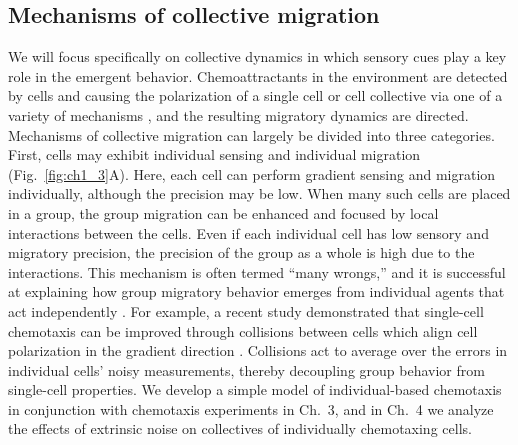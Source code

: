 \subsection{Mechanisms of collective migration}

We will focus specifically on collective dynamics in which sensory cues play a key role in the emergent behavior. Chemoattractants in the environment are detected by cells and causing the polarization of a single cell or cell collective via one of a variety of mechanisms \cite{jilkine2011comparison}, and the resulting migratory dynamics are directed.
Mechanisms of collective migration can largely be divided into three categories. First, cells may exhibit individual sensing and individual migration (Fig.\ \ref{fig:ch1_3}A). Here, each cell can perform gradient sensing and migration individually, although the precision may be low. When many such cells are placed in a group, the group migration can be enhanced and focused by local interactions between the cells. Even if each individual cell has low sensory and migratory precision, the precision of the group as a whole is high due to the interactions. This mechanism is often termed ``many wrongs,'' and it is successful at explaining how group migratory behavior emerges from individual agents that act independently \cite{coburn2013tactile,simons2004many}.
For example, a recent study demonstrated that single-cell chemotaxis can be improved through collisions between cells which align cell polarization in the gradient direction \cite{coburn2013tactile}. Collisions act to average over the errors in individual cells' noisy measurements, thereby decoupling group behavior from single-cell properties. We develop a simple model of individual-based chemotaxis in conjunction with chemotaxis experiments in Ch.\ 3, and in Ch.\ 4 we analyze the effects of extrinsic noise on collectives of individually chemotaxing cells.



